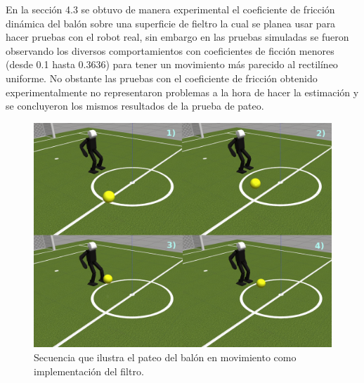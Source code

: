 	En la sección 4.3 se obtuvo de manera experimental el coeficiente de fricción dinámica del balón sobre una superficie de fieltro la cual se planea usar para hacer pruebas con el robot real, sin embargo en las pruebas simuladas se fueron observando los diversos comportamientos con coeficientes de ficción menores (desde 0.1 hasta 0.3636) para tener un movimiento más parecido al rectilíneo uniforme. No obstante las pruebas con el coeficiente de fricción obtenido experimentalmente no representaron problemas a la hora de hacer la estimación y se concluyeron los mismos resultados de la prueba de pateo. 
	
\begin{figure}
\centering
	\includegraphics[scale=0.26]{images/final_test.png}
	\caption{Secuencia que ilustra el pateo del balón en movimiento como implementación del filtro.}
\label{fig:final_test}
\end{figure} 